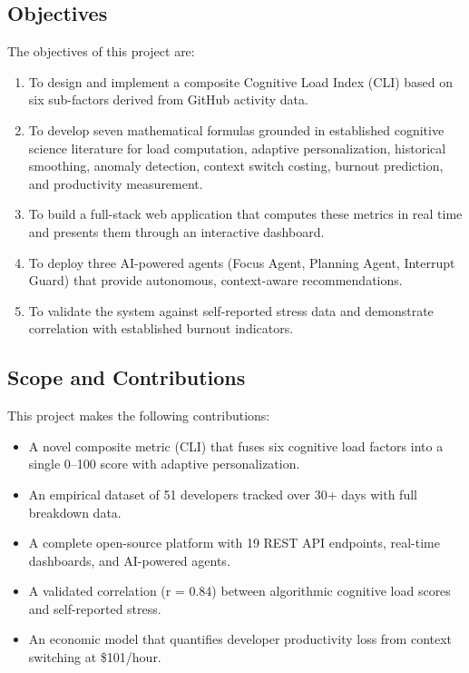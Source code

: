 \documentclass[12pt]{article}
\begin{document}
\subsection{Objectives}

The objectives of this project are:
\begin{enumerate}[noitemsep]
    \item To design and implement a composite Cognitive Load Index (CLI) based on six sub-factors derived from GitHub activity data.
    \item To develop seven mathematical formulas grounded in established cognitive science literature for load computation, adaptive personalization, historical smoothing, anomaly detection, context switch costing, burnout prediction, and productivity measurement.
    \item To build a full-stack web application that computes these metrics in real time and presents them through an interactive dashboard.
    \item To deploy three AI-powered agents (Focus Agent, Planning Agent, Interrupt Guard) that provide autonomous, context-aware recommendations.
    \item To validate the system against self-reported stress data and demonstrate correlation with established burnout indicators.
\end{enumerate}

\subsection{Scope and Contributions}

This project makes the following contributions:
\begin{itemize}[noitemsep]
    \item A novel composite metric (CLI) that fuses six cognitive load factors into a single 0--100 score with adaptive personalization.
    \item An empirical dataset of 51 developers tracked over 30+ days with full breakdown data.
    \item A complete open-source platform with 19 REST API endpoints, real-time dashboards, and AI-powered agents.
    \item A validated correlation (r = 0.84) between algorithmic cognitive load scores and self-reported stress.
    \item An economic model that quantifies developer productivity loss from context switching at \$101/hour.
\end{itemize}
\end{document}

